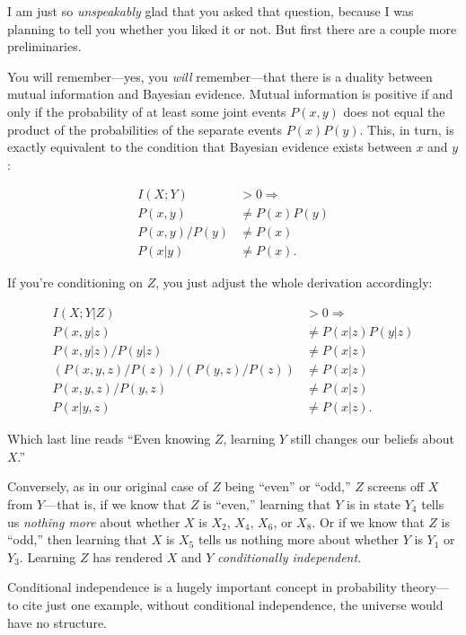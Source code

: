 { I am just so \textit{unspeakably} glad that you asked that
question, because I was planning to tell you whether you liked it or
not. But first there are a couple more preliminaries.


 You will remember---yes, you \textit{will} remember---that there
is a duality between mutual information and Bayesian evidence. Mutual
information is positive if and only if the probability of at least some
joint events $P(x,y)$ does not equal the product of the probabilities of
the separate events $P(x)P(y)$. This, in turn, is exactly equivalent to
the condition that Bayesian evidence exists between $x$ and $y$:

\begin{align*}
 I(X;Y) &> 0 \Rightarrow \\
 P(x,y) &\neq P(x)P(y) \\
 P(x,y) / P(y) &\neq P(x) \\
 P(x|y) &\neq P(x).
\end{align*}



 If you're conditioning on $Z$, you just adjust the
whole derivation accordingly:

\begin{align*}
 I(X;Y|Z) &> 0 \Rightarrow \\
 P(x,y|z) &\neq P(x|z)P(y|z) \\
 P(x,y|z) / P(y|z) &\neq P (x|z) \\
 (P(x,y,z)/P(z)) / (P(y,z)/P(z)) &\neq P(x|z) \\
 P(x,y,z) / P(y,z) &\neq P(x|z) \\
 P(x|y,z) &\neq P(x|z).
\end{align*}


 Which last line reads ``Even knowing $Z$, learning
$Y$ still changes our beliefs about $X$.''


 Conversely, as in our original case of $Z$ being
``even'' or
``odd,'' $Z$ screens off $X$ from
$Y$---that is, if we know that $Z$ is
``even,'' learning that $Y$ is in
state $Y_{4}$ tells us \textit{nothing more} about whether $X$
is $X_{2}$, $X_{4}$, $X_{6}$, or
$X_{8}$. Or if we know that $Z$ is
``odd,'' then learning that $X$ is
$X_{5}$ tells us nothing more about whether $Y$ is
$Y_{1}$ or $Y_{3}$. Learning $Z$ has rendered $X$ and
$Y$ \textit{conditionally independent}.


 Conditional independence is a hugely important concept in
probability theory---to cite just one example, without conditional
independence, the universe would have no structure.


}
